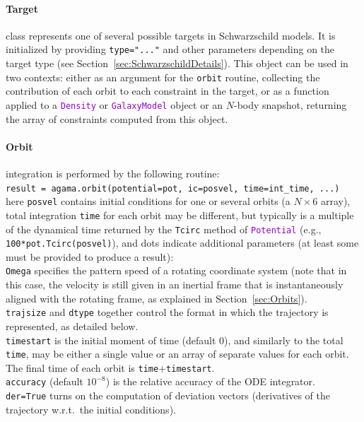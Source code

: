 \documentclass[12pt]{article}
\newcommand{\ttt}[1]{\textcolor{darkviolet}{\texttt{#1}}}
\newcommand{\ppp}[1]{\textcolor{darkolive} {\texttt{#1}}}
\let\oldparagraph\paragraph
\renewcommand{\paragraph}[1]{\vspace{-2mm}\oldparagraph{#1}}
\begin{document}
\paragraph{Target} class represents one of several possible targets in Schwarzschild models. It is initialized by providing \ppp{type="..."} and other parameters depending on the target type (see Section~\ref{sec:SchwarzschildDetails}). This object can be used in two contexts: either as an argument for the \texttt{orbit} routine, collecting the contribution of each orbit to each constraint in the target, or as a function applied to a \ttt{Density} or \ttt{GalaxyModel} object or an $N$-body snapshot, returning the array of constraints computed from this object.

\paragraph{Orbit} integration is performed by the following routine:\\
\texttt{result = agama.orbit(potential=pot, ic=posvel, time=int_time, ...)}\\
here \ppp{posvel} contains initial conditions for one or several orbits (a $N\times6$ array), total integration \ppp{time} for each orbit may be different, but typically is a multiple of the dynamical time returned by the \texttt{Tcirc} method of \ttt{Potential} (e.g., \texttt{100*pot.Tcirc(posvel)}), and dots indicate additional parameters (at least some must be provided to produce a result):\\
\ppp{Omega} specifies the pattern speed of a rotating coordinate system (note that in this case, the velocity is still given in an inertial frame that is instantaneously aligned with the rotating frame, as explained in Section~\ref{sec:Orbits}).\\
\ppp{trajsize} and \ppp{dtype} together control the format in which the trajectory is represented, as detailed below.\\
\ppp{timestart} is the initial moment of time (default 0), and similarly to the total \texttt{time}, may be either a single value or an array of separate values for each orbit. The final time of each orbit is \texttt{time}+\texttt{timestart}.\\
\ppp{accuracy} (default $10^{-8}$) is the relative accuracy of the ODE integrator.\\
\ppp{der}\texttt{=True} turns on the computation of deviation vectors (derivatives of the trajectory w.r.t.\ the initial conditions).\\
\end{document}
